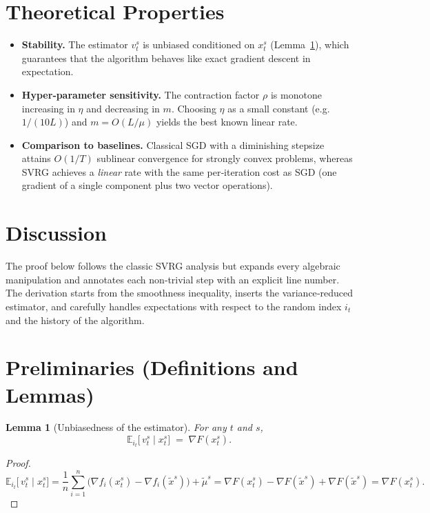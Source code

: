 \documentclass{article}
\newtheorem{lemma}{Lemma}
\newcommand{\E}{\mathbb{E}}
\begin{document}
\section*{Theoretical Properties}
\begin{itemize}[leftmargin=*]
\item \textbf{Stability.} The estimator $v_{t}^{s}$ is unbiased conditioned on $x_{t}^{s}$ (Lemma~\ref{lem:unbiased}), which guarantees that the algorithm behaves like exact gradient descent in expectation.
\item \textbf{Hyper‑parameter sensitivity.} The contraction factor $\rho$ is monotone increasing in $\eta$ and decreasing in $m$. Choosing $\eta$ as a small constant (e.g. $1/(10L)$) and $m=O(L/\mu)$ yields the best known linear rate.
\item \textbf{Comparison to baselines.} Classical SGD with a diminishing stepsize attains $O(1/T)$ sublinear convergence for strongly convex problems, whereas SVRG achieves a \emph{linear} rate with the same per‑iteration cost as SGD (one gradient of a single component plus two vector operations).
\end{itemize}

\section*{Discussion}
The proof below follows the classic SVRG analysis but expands every algebraic manipulation and annotates each non‑trivial step with an explicit line number. The derivation starts from the smoothness inequality, inserts the variance‑reduced estimator, and carefully handles expectations with respect to the random index $i_t$ and the history of the algorithm.

\section*{Preliminaries (Definitions and Lemmas)}
\begin{lemma}[Unbiasedness of the estimator]\label{lem:unbiased}
For any $t$ and $s$,
\[
\E_{i_t}\!\bigl[\,v_{t}^{s}\mid x_{t}^{s}\bigr]\;=\;\nabla F(x_{t}^{s}).
\]
\end{lemma}
\begin{proof}
\[
\E_{i_t}\!\bigl[\,v_{t}^{s}\mid x_{t}^{s}\bigr]
= \frac{1}{n}\sum_{i=1}^{n}\bigl(\nabla f_i(x_{t}^{s})-\nabla f_i(\tilde{x}^{s})\bigr)+\tilde{\mu}^{s}
= \nabla F(x_{t}^{s})-\nabla F(\tilde{x}^{s})+\nabla F(\tilde{x}^{s})
= \nabla F(x_{t}^{s}).
\tag*{$\square$}
\]
\end{proof}
\end{document}
